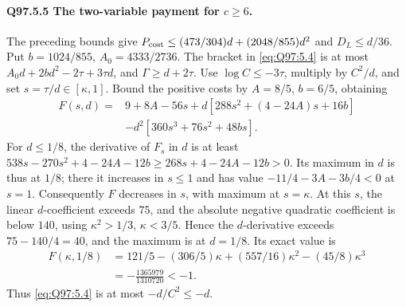 \paragraph{Q97.5.5 The two-variable payment for \(c\ge\allowbreak 6\).}
The preceding bounds give
\(P_{\rm cost}\le\allowbreak (473/304)d+(2048/855)d^2\) and \(D_L\le\allowbreak  d/36\).
Put \(b=\allowbreak 1024/855\), \(A_0=\allowbreak 4333/2736\).
The bracket in \eqref{eq:Q97:5.4} is at most
\(A_0d+2bd^2-2\tau+3\tau d\), and \(\Gamma\ge\allowbreak  d+2\tau\).
Use \(\log C\le\allowbreak -3\tau\), multiply by \(C^2/d\), and set
\(s=\allowbreak \tau/d\in[\kappa,\allowbreak 1]\). Bound the positive costs by
\(A=\allowbreak 8/5\), \(b=\allowbreak 6/5\), obtaining
\begin{equation}\tag{Q97.5.5}\label{eq:Q97:5.5}
\begin{aligned}
F(s,d)={}&9+8A-56s+d[288s^2+(4-24A)s+16b]\\
&-d^2[360s^3+76s^2+48bs].
\end{aligned}
\end{equation}
For \(d\le\allowbreak 1/8\), the derivative of \(F_s\) in \(d\) is at least
\(538s-270s^2+4-24A-12b\ge\allowbreak 268s+4-24A-12b>\allowbreak 0\).
Its maximum in \(d\) is thus at \(1/8\); there it increases in
\(s\le\allowbreak 1\) and has value \(-11/4-3A-3b/4<\allowbreak 0\) at \(s=\allowbreak 1\).
Consequently \(F\) decreases in \(s\), with maximum at \(s=\allowbreak \kappa\).
At this \(s\), the linear \(d\)-coefficient exceeds \(75\), and the
absolute negative quadratic coefficient is below \(140\), using
\(\kappa^2>\allowbreak 1/3\), \(\kappa<\allowbreak 3/5\).
Hence the \(d\)-derivative exceeds \(75-140/4=\allowbreak 40\), and the maximum
is at \(d=\allowbreak 1/8\). Its exact value is
\begin{equation}\tag{Q97.5.6}\label{eq:Q97:5.6}
\begin{aligned}
F(\kappa,1/8)&=121/5-(306/5)\kappa+(557/16)\kappa^2-(45/8)\kappa^3\\
&=-\frac{1365979}{1310720}<-1.
\end{aligned}
\end{equation}
Thus \eqref{eq:Q97:5.4} is at most \(-d/C^2\le\allowbreak -d\).

